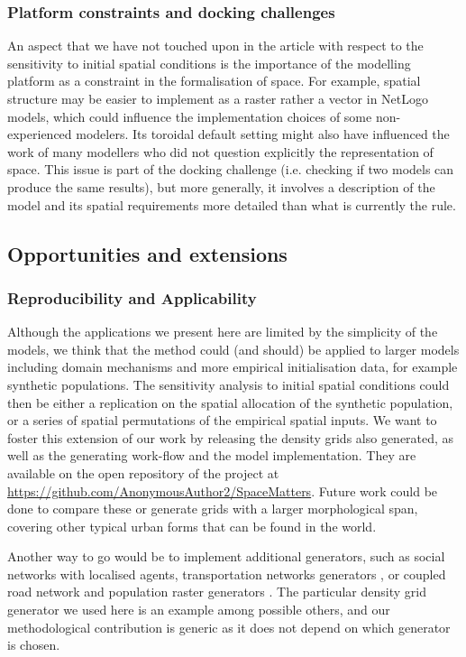 \documentclass{JASSS}
\begin{document}
\subsubsection{Platform constraints and docking challenges}

An aspect that we have not touched upon in the article with respect to the sensitivity to initial spatial conditions is the importance of the modelling platform as a constraint in the formalisation of space. For example, spatial structure may be easier to implement as a raster rather a vector in NetLogo models, which could influence the implementation choices of some non-experienced modelers. Its toroidal default setting might also have influenced the work of many modellers who did not question explicitly the representation of space. This issue is part of the docking challenge \citep{Axtelletal1996} (i.e. checking if two models can produce the same results), but more generally, it involves a description of the model and its spatial requirements more detailed than what is currently the rule.



\subsection{Opportunities and extensions}


\subsubsection{Reproducibility and Applicability} 


Although the applications we present here are limited by the simplicity of the models, we think that the method could (and should) be applied to larger models including domain mechanisms and more empirical initialisation data, for example synthetic populations. The sensitivity analysis to initial spatial conditions could then be either a replication on the spatial allocation of the synthetic population, or a series of spatial permutations of the empirical spatial inputs.
We want to foster this extension of our work by releasing the density grids also generated, as well as the generating work-flow and the model implementation. They are available on the open repository of the project at \url{https://github.com/AnonymousAuthor2/SpaceMatters}. Future work could be done to compare these or generate grids with a larger morphological span, covering other typical urban forms that can be found in the world.

Another way to go would be to implement additional generators, such as social networks \citep{alizadeh2016generating} with localised agents, transportation networks generators \citep{raimbault2018multi}, or coupled road network and population raster generators \citep{raimbault2019urban}. The particular density grid generator we used here is an example among possible others, and our methodological contribution is generic as it does not depend on which generator is chosen.  
\end{document}
